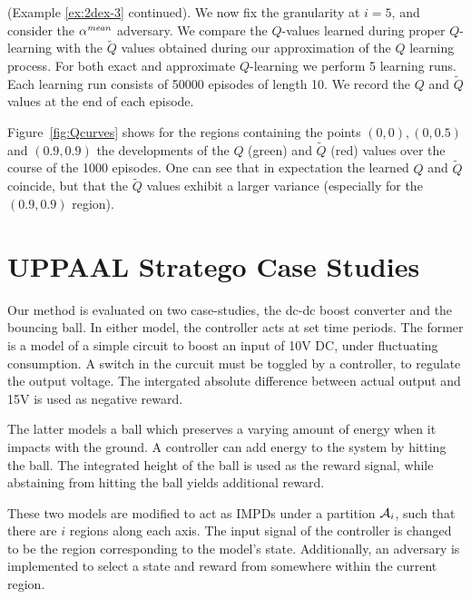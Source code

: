 \documentclass{llncs}
\begin{document}
\begin{example}
\label{ex:2dex-4}
(Example \ref{ex:2dex-3} continued). We now fix the granularity at $i=5$, and 
consider the $\alpha^{\emph{mean}}$ adversary.  We compare the $Q$-values learned during proper $Q$-learning with
the $\tilde{Q}$ values obtained during our approximation of the $Q$ learning process. 
For both exact and approximate $Q$-learning we perform 5 learning
runs. Each learning run consists of 50000 episodes of length 10.
We record the $Q$ and $\tilde{Q}$ values
at the end of each episode. 

Figure~\ref{fig:Qcurves} shows for the regions containing the points $(0,0), (0,0.5)$ and $(0.9,0.9)$
the developments of the
$Q$ (green) and $\tilde{Q}$ (red) values over the course of the 1000 episodes. One can see that in expectation
the learned $Q$ and $\tilde{Q}$ coincide, but that the  $\tilde{Q}$ values exhibit a larger variance (especially
for the $(0.9,0.9)$ region). 
\end{example}



\section{UPPAAL Stratego Case Studies}

Our method is evaluated on two case-studies, the dc-dc boost converter\cite{dcdcconverter}
and the bouncing ball\cite{playball}. 
In either model, the controller acts at set time periods.
The former is a model of a simple circuit to boost an input of 10V DC, under fluctuating consumption. 
A switch in the curcuit must be toggled by a controller, to regulate the output voltage. 
The intergated absolute difference between actual output and 15V is used as negative reward.

The latter models a ball which preserves a varying amount of energy when it impacts with the ground.
A controller can add energy to the system by hitting the ball. 
The integrated height of the ball is used as the reward signal, while abstaining from hitting the ball
yields additional reward.

These two models are modified to act as IMPDs under a partition $\mathcal{A}_i$, 
such that there are $i$ regions along each axis. 
The input signal of the controller is changed to be the region corresponding to the model's state.  
Additionally, an  adversary is implemented to select a state and reward from somewhere within the current region.
\end{document}
